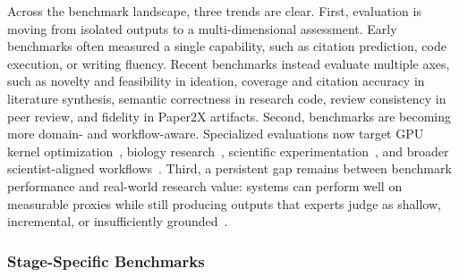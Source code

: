 \documentclass{llmxive}
\begin{document}
Across the benchmark landscape, three trends are clear. First, evaluation is moving from isolated outputs to a multi-dimensional assessment. Early benchmarks often measured a single capability, such as citation prediction, code execution, or writing fluency. Recent benchmarks instead evaluate multiple axes, such as novelty and feasibility in ideation, coverage and citation accuracy in literature synthesis, semantic correctness in research code, review consistency in peer review, and fidelity in Paper2X artifacts. Second, benchmarks are becoming more domain- and workflow-aware. Specialized evaluations now target GPU kernel optimization~\cite{kernelbench2025,tritonbench2025}, biology research~\cite{labbench2024}, scientific experimentation~\cite{expbench2025}, and broader scientist-aligned workflows~\cite{astabench2025,researchclawbench2025}. Third, a persistent gap remains between benchmark performance and real-world research value: systems can perform well on measurable proxies while still producing outputs that experts judge as shallow, incremental, or insufficiently grounded~\cite{llmreviewer2025,cycleresearcher2024}.


\subsubsection{Stage-Specific Benchmarks}
\label{sec:bench_overview}
\end{document}
